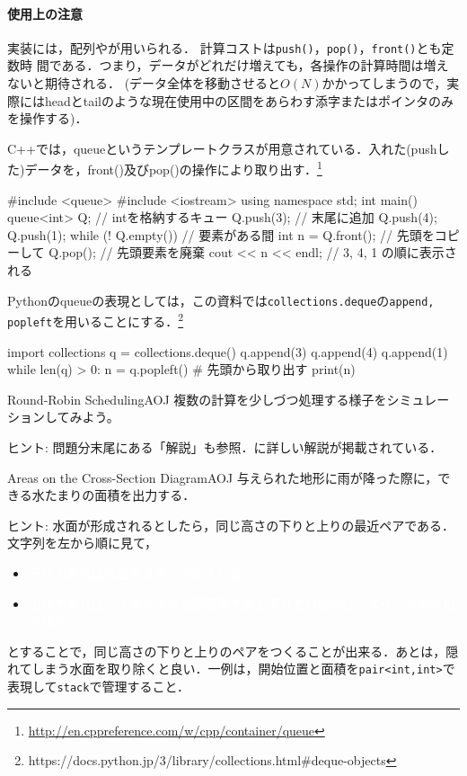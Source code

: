 \paragraph{使用上の注意}
実装には，配列やが用いられる．
計算コストは\texttt{push()}，\texttt{pop()}，\texttt{front()}とも定数時
間である．つまり，データがどれだけ増えても，各操作の計算時間は増えないと期待される．
(データ全体を移動させると$O(N)$かかってしまうので，実際にはheadとtailのような現在使用中の区間をあらわす添字またはポインタのみを操作する)．

C++では，queueというテンプレートクラスが用意されている．入れた(pushし
た)データを，front()及びpop()の操作により取り出す．\footnote{\url{http://en.cppreference.com/w/cpp/container/queue}}
\begin{cbox}[emph={queue,push,front,pop}]
#include <queue>
#include <iostream>
using namespace std;
int main() {
    queue<int> Q; // intを格納するキュー
    Q.push(3); // 末尾に追加
    Q.push(4);
    Q.push(1);
    while (! Q.empty()) { // 要素がある間
	int n = Q.front(); // 先頭をコピーして
	Q.pop(); // 先頭要素を廃棄
	cout << n << endl; // 3, 4, 1  の順に表示される
    }
}
\end{cbox}

Pythonのqueueの表現としては，この資料では\texttt{collections.deque}の\texttt{append, popleft}を用いることにする．\footnote{https://docs.python.jp/3/library/collections.html\#deque-objects}
\begin{pybox}[emph={append,popleft}]
import collections
q = collections.deque()
q.append(3)
q.append(4)
q.append(1)
while len(q) > 0:
    n = q.popleft() # 先頭から取り出す
    print(n)
\end{pybox}


\begin{psbox}{Round-Robin Scheduling}{AOJ}
複数の計算を少しづつ処理する様子をシミュレーションしてみよう。

\end{psbox}

ヒント: 問題分末尾にある「解説」も参照．\pcaojbook[p.82]に詳しい解説が掲載されている．

\begin{pbox}{Areas on the Cross-Section Diagram}{AOJ}
与えられた地形に雨が降った際に，できる水たまりの面積を出力する．

\end{pbox}

ヒント: 水面が形成されるとしたら，同じ高さの下りと上りの最近ペアである．
文字列を左から順に見て，
\begin{itemize}
\item \textcolor{white}{下りであれば位置をスタックに入れる}
\item \textcolor{white}{上りであれば，スタックの先頭要素である下りと対応させ，スタックから取り除く}
\end{itemize}
とすることで，同じ高さの下りと上りのペアをつくることが出来る．あとは，隠れてしまう水面を取り除くと良い．一例は，開始位置と面積を\texttt{pair<int,int>}で表現して\texttt{stack}で管理すること．

